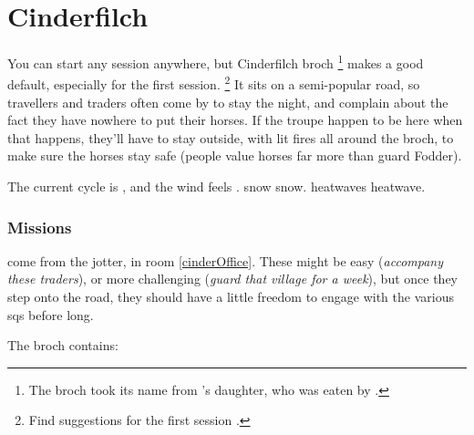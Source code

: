 \section{Cinderfilch }
\label{cinderfilch}



\begin{multicols}{2}

\noindent
You can start any session anywhere, but Cinderfilch \gls{broch}%
\footnote{The \gls{broch} took its name from 's daughter, who was eaten by .}
makes a good default, especially for the first session.%
\footnote{Find suggestions for the first session .}
It sits on a semi-popular road, so travellers and traders often come by to stay the night, and complain about the fact they have nowhere to put their horses.
If the troupe happen to be here when that happens, they'll have to stay outside, with lit fires all around the \gls{broch}, to make sure the horses stay safe (people value horses far more than \gls{guard} Fodder).

The current \gls{cycle} is \showCycle, and the wind feels \showTemperature.
\ifcase\value{temperature}%
  \Gls{snow} \glsdesc{snow}.
\or%
\or%
\else%
  \Glspl{heatwave} \glsdesc{heatwave}.
\fi%

\subsubsection{Missions}
come from the \gls{jotter}, in room \ref{cinderOffice}.%
These might be easy (\textit{accompany these traders}), or more challenging (\textit{guard that \gls{village} for a week}), but once they step onto the road, they should have a little freedom to engage with the various \glspl{sq} before long.

The \gls{broch} contains:


\end{multicols}
